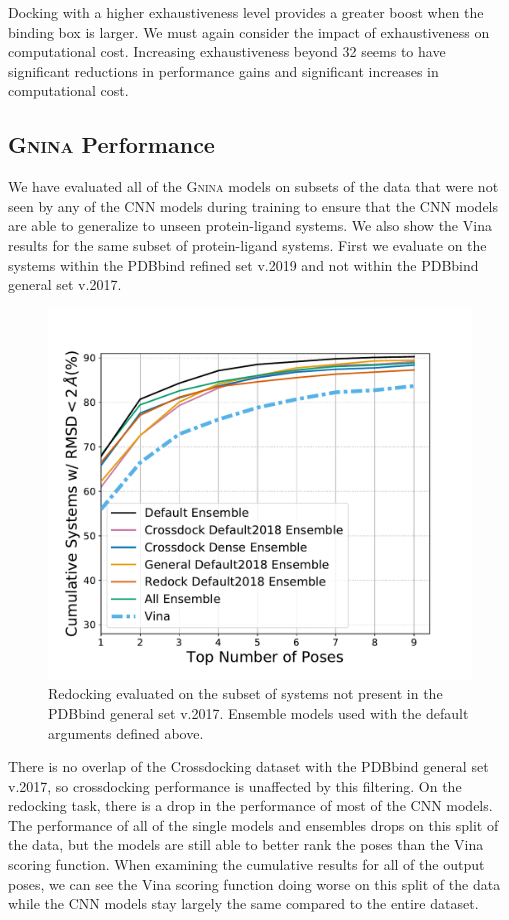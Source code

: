 \documentclass[journal=jcisd8,manuscript=article]{achemso}
\begin{document}
Docking with a higher exhaustiveness level provides a greater boost when the binding box is larger. We must again consider the impact of exhaustiveness on computational cost. Increasing exhaustiveness beyond 32 seems to have significant reductions in performance gains and significant increases in computational cost. 

\subsection{\textsc{Gnina} Performance}
We have evaluated all of the \textsc{Gnina} models on subsets of the data that were not seen by any of the CNN models during training to ensure that the CNN models are able to generalize to unseen protein-ligand systems. We also show the Vina results for the same subset of protein-ligand systems. First we evaluate on the systems within the PDBbind refined set v.2019 and not within the PDBbind general set v.2017.
\begin{figure}    
	\centering
	\includegraphics[width=\textwidth]{figures/redocking/ensemble_models_no2017_line.pdf}
	\caption{Redocking evaluated on the subset of systems not present in the PDBbind general set v.2017. Ensemble models used with the default arguments defined above.}
	\label{fig:No2017}
\end{figure}
There is no overlap of the Crossdocking dataset with the PDBbind general set v.2017, so crossdocking performance is unaffected by this filtering. On the redocking task, there is a drop in the performance of most of the CNN models. The performance of all of the single models and ensembles drops on this split of the data, but the models are still able to better rank the poses than the Vina scoring function. When examining the cumulative results for all of the output poses, we can see the Vina scoring function doing worse on this split of the data while the CNN models stay largely the same compared to the entire dataset.
\end{document}
